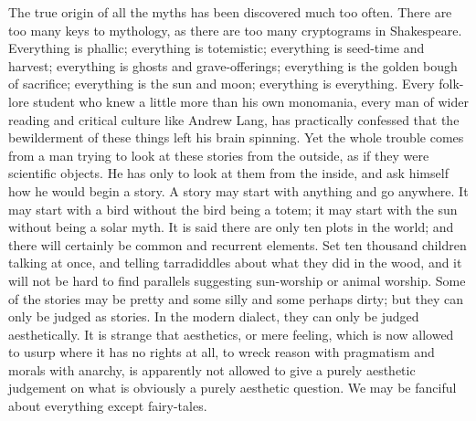 The true origin of all the myths has been discovered much too often. There are too many keys to mythology, as there are too many cryptograms in Shakespeare. Everything is phallic; everything is totemistic; everything is seed-time and harvest; everything is ghosts and grave-offerings; everything is the golden bough of sacrifice; everything is the sun and moon; everything is everything. Every folk-lore student who knew a little more than his own monomania, every man of wider reading and critical culture like Andrew Lang, has practically confessed that the bewilderment of these things left his brain spinning. Yet the whole trouble comes from a man trying to look at these stories from the outside, as if they were scientific objects. He has only to look at them from the inside, and ask himself how he would begin a story. A story may start with anything and go anywhere. It may start with a bird without the bird being a totem; it may start with the sun without being a solar myth. It is said there are only ten plots in the world; and there will certainly be common and recurrent elements. Set ten thousand children talking at once, and telling tarradiddles about what they did in the wood, and it will not be hard to find parallels suggesting sun-worship or animal worship. Some of the stories may be pretty and some silly and some perhaps dirty; but they can only be judged as stories. In the modern dialect, they can only be judged aesthetically. It is strange that aesthetics, or mere feeling, which is now allowed to usurp where it has no rights at all, to wreck reason with pragmatism and morals with anarchy, is apparently not allowed to give a purely aesthetic judgement on what is obviously a purely aesthetic question. We may be fanciful about everything except fairy-tales.

